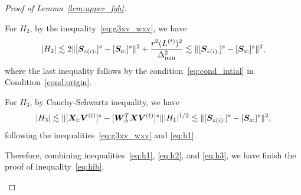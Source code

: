 \documentclass[lettersize,onecolumn,journal]{IEEEtran}
\theoremstyle{definition}
\theoremstyle{definition}
\begin{document}
\begin{proof}[Proof of Lemma~\ref{lem:upper_fgh}]
\begin{enumerate}
    For $H_2$, by the inequality~\eqref{eq:g3xv_wxv}, we have 
    \begin{equation}\label{eq:h2}
        |H_2| \lesssim 2 \onormSize{}{ [ \mS_{z(i):} ]^s - [ \mS_{a:}]^s }^2 + \frac{r^2 (L^{(t)})^2}{\Delta_{\min}^2} \lesssim \onormSize{}{ [ \mS_{z(i):} ]^s - [ \mS_{a:}]^s }^2,
    \end{equation}
    where the last inequality follows by the condition~\eqref{eq:cond_intial} in Condition~\ref{cond:origin}.
    
    
    For $H_3$,  by Cauchy-Schwartz inequality, we have 
    \begin{equation}\label{eq:h3}
         |H_3| \lesssim \onormSize{}{[\mX_{i:} \mV^{(t)}]^s  -  [  \mW_{:b}^T \mX \mV^{(t)} ]^s} |H_1|^{1/2} \lesssim \onormSize{}{ [ \mS_{z(i):} ]^s - [ \mS_{a:}]^s }^2,
    \end{equation}
    following the inequalities~\eqref{eq:g3xv_wxv} and \eqref{eq:h1}.
    
    
    Therefore, combining inequalities~\eqref{eq:h1}, \eqref{eq:h2}, and \eqref{eq:h3}, we have finish the proof of inequality~\eqref{eq:hib}.

\end{enumerate}


\end{proof}
\end{document}
